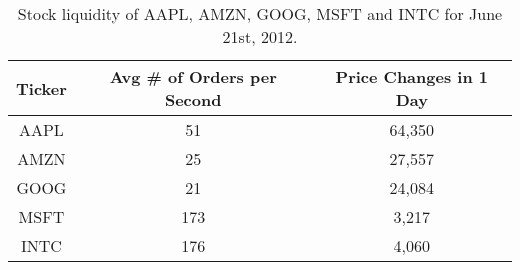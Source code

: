 \begin{table}[htpb]
\centering
\begin{tabular}{c|c|c}

Ticker & Avg \# of Orders per Second & Price Changes in 1 Day\\
\hline
AAPL & 51 & 64,350\\
AMZN & 25 & 27,557\\
GOOG & 21 & 24,084\\
MSFT & 173 & 3,217\\
INTC & 176 & 4,060\\

\end{tabular}
\caption{\label{table:liquidity} Stock liquidity of AAPL, AMZN, GOOG, MSFT and INTC for June 21st, 2012.}
\end{table}